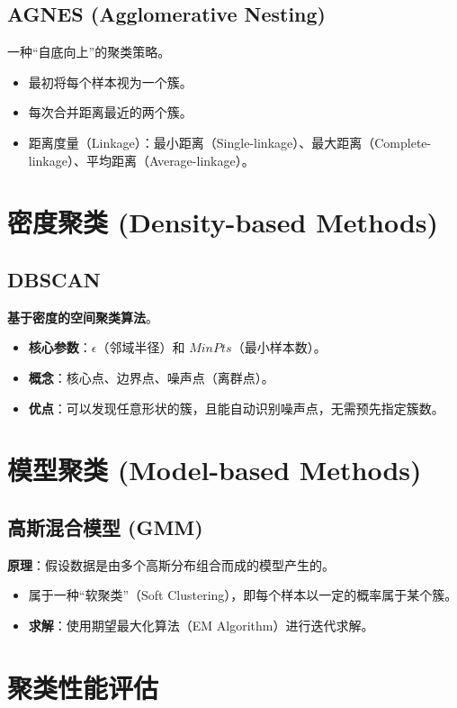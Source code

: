 \documentclass[12pt, a4paper]{article}
\begin{document}
\subsection{AGNES (Agglomerative Nesting)}
一种“自底向上”的聚类策略。
\begin{itemize}
    \item 最初将每个样本视为一个簇。
    \item 每次合并距离最近的两个簇。
    \item 距离度量（Linkage）：最小距离（Single-linkage）、最大距离（Complete-linkage）、平均距离（Average-linkage）。
\end{itemize}

\section{密度聚类 (Density-based Methods)}

\subsection{DBSCAN}
\textbf{基于密度的空间聚类算法}。
\begin{itemize}
    \item \textbf{核心参数}：$\epsilon$（邻域半径）和 $MinPts$（最小样本数）。
    \item \textbf{概念}：核心点、边界点、噪声点（离群点）。
    \item \textbf{优点}：可以发现任意形状的簇，且能自动识别噪声点，无需预先指定簇数。
\end{itemize}

\section{模型聚类 (Model-based Methods)}

\subsection{高斯混合模型 (GMM)}
\textbf{原理}：假设数据是由多个高斯分布组合而成的模型产生的。
\begin{itemize}
    \item 属于一种“软聚类”（Soft Clustering），即每个样本以一定的概率属于某个簇。
    \item \textbf{求解}：使用期望最大化算法（EM Algorithm）进行迭代求解。
\end{itemize}

\section{聚类性能评估}
\end{document}
